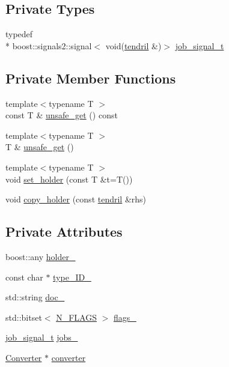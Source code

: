 \subsection*{Private Types}
\begin{DoxyCompactItemize}
\item 
typedef \\*
boost\-::signals2\-::signal$<$ void(\hyperlink{classecto_1_1tendril}{tendril} \&)$>$ \hyperlink{classecto_1_1tendril_a59a62b4ac15de3a6a63a515dace8c420}{job\-\_\-signal\-\_\-t}
\end{DoxyCompactItemize}
\subsection*{Private Member Functions}
\begin{DoxyCompactItemize}
\item 
{\footnotesize template$<$typename T $>$ }\\const T \& \hyperlink{classecto_1_1tendril_a28d02ba43d5ab79639436674ceb4316e}{unsafe\-\_\-get} () const 
\item 
{\footnotesize template$<$typename T $>$ }\\T \& \hyperlink{classecto_1_1tendril_ab3844fa9929e75160b6d8597d1c44cf9}{unsafe\-\_\-get} ()
\item 
{\footnotesize template$<$typename T $>$ }\\void \hyperlink{classecto_1_1tendril_ae8da62875367ec7b906f1f350dff4492}{set\-\_\-holder} (const T \&t=T())
\item 
void \hyperlink{classecto_1_1tendril_a1751ddffc72288bfbd460a559a276a76}{copy\-\_\-holder} (const \hyperlink{classecto_1_1tendril}{tendril} \&rhs)
\end{DoxyCompactItemize}
\subsection*{Private Attributes}
\begin{DoxyCompactItemize}
\item 
boost\-::any \hyperlink{classecto_1_1tendril_a8bc7ae1c22c1af9765284666af02868b}{holder\-\_\-}
\item 
const char $\ast$ \hyperlink{classecto_1_1tendril_a5b237bfa0a9acefc48d577b77380058d}{type\-\_\-\-I\-D\-\_\-}
\item 
std\-::string \hyperlink{classecto_1_1tendril_a6e8304d03aa8a24be843d3bb8d26332d}{doc\-\_\-}
\item 
std\-::bitset$<$ \hyperlink{classecto_1_1tendril_ab63b76909681783917fcb55e3c89f4aca8748e76437a722b0cfb3652fefd47d67}{N\-\_\-\-F\-L\-A\-G\-S} $>$ \hyperlink{classecto_1_1tendril_a7b2a11ba7c80606fafda80d34b0a1bfe}{flags\-\_\-}
\item 
\hyperlink{classecto_1_1tendril_a59a62b4ac15de3a6a63a515dace8c420}{job\-\_\-signal\-\_\-t} \hyperlink{classecto_1_1tendril_acf171c75c0ace5cd108e8355ee83199c}{jobs\-\_\-}
\item 
\hyperlink{structecto_1_1tendril_1_1Converter}{Converter} $\ast$ \hyperlink{classecto_1_1tendril_ac4d6bcc7c0f82c7017a9e0c53a942121}{converter}
\end{DoxyCompactItemize}
